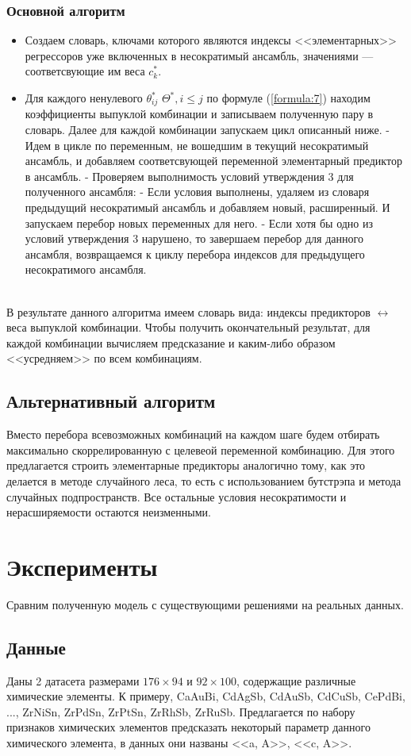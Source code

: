 \documentclass{article}
\begin{document}
\subsubsection{Основной алгоритм}
\label{algorithm}
\begin{itemize}
    \item Создаем словарь, ключами которого являются индексы <<элементарных>> регрессоров уже включенных в несократимый ансамбль, значениями — соответсвующие им веса $c^*_k$.
    \item Для каждого ненулевого $\theta^*_{ij}$ \in $\Theta^*, i \leq j$ по формуле (\ref{formula:7}) находим коэффициенты выпуклой комбинации и записываем полученную пару в словарь. Далее для каждой комбинации запускаем цикл описанный ниже.
    \subitem - Идем в цикле по переменным, не вошедшим в текущий несократимый ансамбль, и добавляем соответсвующей переменной элементарный предиктор в ансамбль.
    \subitem - Проверяем выполнимость условий утверждения 3 для полученного ансамбля:
    \subitem - Если условия выполнены, удаляем из словаря предыдущий несократимый ансамбль и добавляем новый, расширенный. И запускаем перебор новых переменных для него.
    \subitem - Если хотя бы одно из условий утверждения 3 нарушено, то завершаем перебор для данного ансамбля, возвращаемся к циклу перебора индексов для предыдущего несократимого ансамбля.    
\end{itemize} \\
В результате данного алгоритма имеем словарь вида: индексы предикторов $\leftrightarrow$ веса выпуклой комбинации. Чтобы получить окончательный результат, для каждой комбинации вычисляем предсказание и каким-либо образом <<усредняем>> по всем комбинациям.
\subsection{Альтернативный алгоритм}
Вместо перебора всевозможных комбинаций на каждом шаге будем отбирать максимально скоррелированную с целевеой переменной комбинацию. Для этого предлагается строить элементарные предикторы аналогично тому, как это делается в методе случайного леса, то есть с использованием бутстрэпа и метода случайных подпространств. Все остальные условия несократимости и нерасширяемости остаются неизменными.
\section{Эксперименты}
Сравним полученную модель с существующими решениями на реальных данных.
\subsection{Данные}
Даны 2 датасета размерами $176 \times 94$ и $92 \times 100$, содержащие различные химические элементы. К примеру, CaAuBi, CdAgSb, CdAuSb, CdCuSb, CePdBi, ..., ZrNiSn, ZrPdSn, ZrPtSn, ZrRhSb, ZrRuSb. Предлагается по набору признаков химических элементов предсказать некоторый параметр данного химического элемента, в данных они названы <<a, A>>, <<c, A>>.
\end{document}
